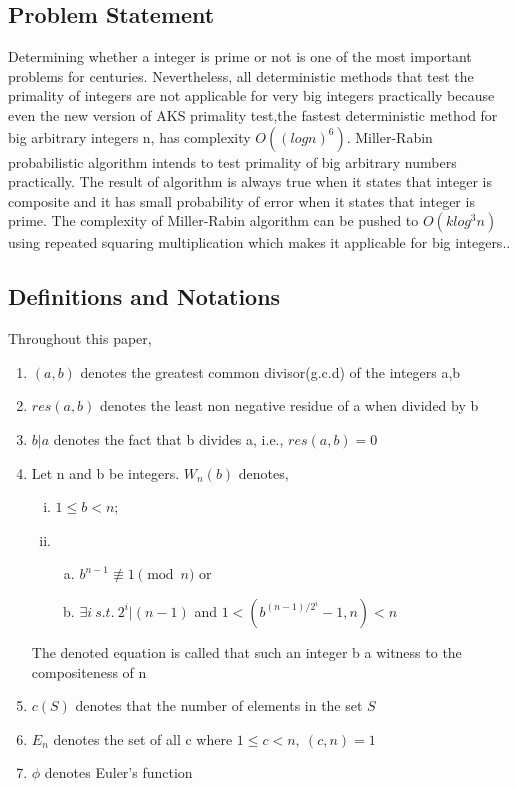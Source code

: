 \documentclass[conference]{IEEEtran}
\begin{document}
\subsection{Problem Statement}
Determining whether a integer is prime or not is one of the most important problems for centuries. Nevertheless, all deterministic methods that test the primality of integers are not applicable for very big integers practically because even the new version of AKS\cite{lenstra2019primality} primality test,the fastest deterministic method for big arbitrary integers n, has complexity $O((logn)^{6})$. Miller-Rabin probabilistic algorithm intends to test primality of big arbitrary numbers practically. The result of algorithm is always true when it states that integer is composite and it has small probability of error when it states that integer is prime. The complexity of Miller-Rabin algorithm can be pushed to $O(klog^{3}n)$ using repeated squaring multiplication which makes it applicable for big integers.\cite{unknown-author-2022}.     
\subsection{Definitions and Notations}
Throughout this paper,
\begin{enumerate}
    \item $(a,b)$ denotes the greatest common divisor(g.c.d) of the integers a,b
    \item $res(a,b)$ denotes the least non negative residue of a when divided by b
    \item $b|a$ denotes the fact that b divides a, i.e., $res(a,b)=0$
    \item Let n and b be integers. $W_n(b)$ denotes,
    \begin{enumerate}[(i)]
        \item $1 \leq b < n$;
        \item
        \begin{enumerate}[(a)]
            \item $b^{n-1} \not\equiv 1 \pmod{n}$ or
            \item $\exists i \: s.t. \: 2^{i} | (n-1)$ and $1 < (b^{(n-1)/2^{i}} - 1,n) < n$
        \end{enumerate}
    \end{enumerate}
    The denoted equation is called that such an integer b a witness to the compositeness of n
    \item $c(S)$ denotes that the number of elements in the set $S$
    \item $E_n$ denotes the set of all c where $1 \leq c < n, \: (c,n) = 1$
    \item $\phi$ denotes Euler's function
\end{enumerate}
 
\end{document}

